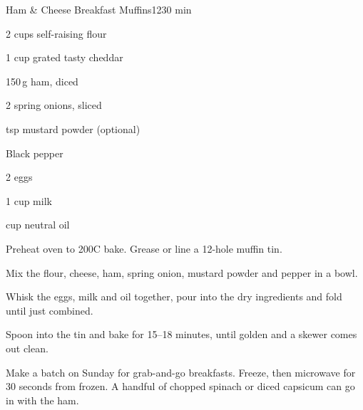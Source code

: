 \begin{recipebox}{Ham \& Cheese Breakfast Muffins}{12}{30 min}
\begin{ingredients}
  \item 2 cups self-raising flour
  \item 1 cup grated tasty cheddar
  \item 150\,g ham, diced
  \item 2 spring onions, sliced
  \item {} tsp mustard powder (optional)
  \item Black pepper
  \item 2 eggs
  \item 1 cup milk
  \item {} cup neutral oil
\end{ingredients}

\begin{method}
  \item Preheat oven to 200\degree C bake. Grease or line a 12-hole muffin tin.
  \item Mix the flour, cheese, ham, spring onion, mustard powder and pepper in a bowl.
  \item Whisk the eggs, milk and oil together, pour into the dry ingredients and fold until just combined.
  \item Spoon into the tin and bake for 15--18 minutes, until golden and a skewer comes out clean.
\end{method}

\begin{notes}
Make a batch on Sunday for grab-and-go breakfasts. Freeze, then microwave for 30 seconds from frozen.
A handful of chopped spinach or diced capsicum can go in with the ham.
\end{notes}
\end{recipebox}
